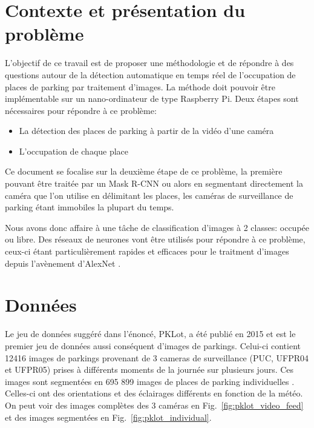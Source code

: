 \documentclass[12pt]{article}
\begin{document}
\maketitle


\section{Contexte et présentation du problème}

L'objectif de ce travail est de proposer une méthodologie et de répondre à des questions autour de la détection automatique en temps réel de l'occupation de places de parking par traitement d'images. La méthode doit pouvoir être implémentable sur un nano-ordinateur de type Raspberry Pi. Deux étapes sont nécessaires pour répondre à ce problème:

\begin{itemize}
    \item La détection des places de parking à partir de la vidéo d'une caméra
    \item L'occupation de chaque place
\end{itemize}

Ce document se focalise sur la deuxième étape de ce problème, la première pouvant être traitée par un Mask R-CNN \citep{He2017} ou alors en segmentant directement la caméra que l'on utilise en délimitant les places, les caméras de surveillance de parking étant immobiles la plupart du temps.

Nous avons donc affaire à une tâche de classification d'images à 2 classes: occupée ou libre. Des réseaux de neurones vont être utilisés pour répondre à ce problème, ceux-ci étant particulièrement rapides et efficaces pour le traitment d'images depuis l'avènement d'AlexNet \citep{alexnet}.

\section{Données}

Le jeu de données suggéré dans l'énoncé, PKLot, a été publié en 2015 \citep{deAlmeida2015} et est le premier jeu de données aussi conséquent d'images de parkings. Celui-ci contient 12416 images de parkings provenant de 3 cameras de surveillance (PUC, UFPR04 et UFPR05) prises à différents moments de la journée sur plusieurs jours. Ces images sont segmentées en 695 899 images de places de parking individuelles \citep{deAlmeida2015}. Celles-ci ont des orientations et des éclairages différents en fonction de la météo. On peut voir des images complètes des 3 caméras en Fig.~\ref{fig:pklot_video_feed} et des images segmentées en Fig.~\ref{fig:pklot_individual}.
\end{document}
